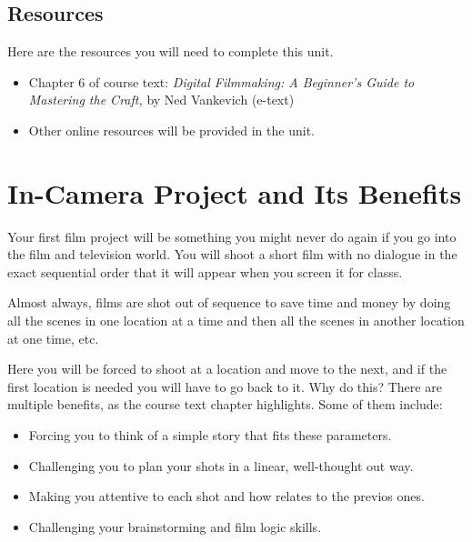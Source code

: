 \documentclass[
]{book}
\providecommand{\tightlist}{%
  \setlength{\itemsep}{0pt}\setlength{\parskip}{0pt}}
\begin{document}
\hypertarget{resources-5}{%
\subsection*{Resources}\label{resources-5}}

Here are the resources you will need to complete this unit.

\begin{itemize}
\tightlist
\item
  Chapter 6 of course text: \emph{Digital Filmmaking: A Beginner's Guide to Mastering the Craft,} by Ned Vankevich (e-text)
\item
  Other online resources will be provided in the unit.
\end{itemize}

\hypertarget{in-camera-project-and-its-benefits}{%
\section{In-Camera Project and Its Benefits}\label{in-camera-project-and-its-benefits}}

Your first film project will be something you might never do again if you go into the film and television world. You will shoot a short film with no dialogue in the exact sequential order that it will appear when you screen it for classs.

Almost always, films are shot out of sequence to save time and money by doing all the scenes in one location at a time and then all the scenes in another location at one time, etc.

Here you will be forced to shoot at a location and move to the next, and if the first location is needed you will have to go back to it. Why do this? There are multiple benefits, as the course text chapter highlights. Some of them include:

\begin{itemize}
\tightlist
\item
  Forcing you to think of a simple story that fits these parameters.\\
\item
  Challenging you to plan your shots in a linear, well-thought out way.\\
\item
  Making you attentive to each shot and how relates to the previos ones.\\
\item
  Challenging your brainstorming and film logic skills.
\end{itemize}
\end{document}
